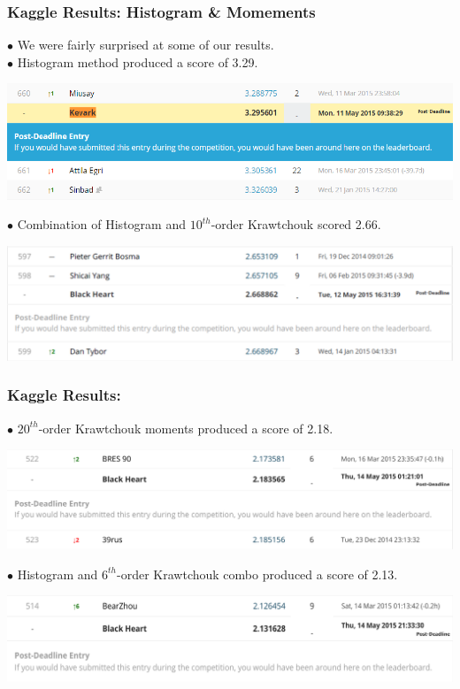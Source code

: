 \documentclass{beamer}
\begin{document}
\begin{frame}
	\frametitle{Kaggle Results: Histogram \& Momements}
$\bullet$ We were fairly surprised at some of our results.\\
$\bullet$ Histogram method produced a score of 3.29. \\
\begin{center}
	\includegraphics[scale=0.3]{submission.png}
\end{center}
$\bullet$ Combination of Histogram and $10^{th}$-order Krawtchouk scored 2.66\footnotemark. \\
\begin{center}
	\includegraphics[scale=0.25]{combined.png}
\end{center} 


\normalsize
\end{frame}


\begin{frame}
	\frametitle{Kaggle Results:}
$\bullet$ $20^{th}$-order Krawtchouk moments produced a score of 2.18. \\
\begin{center}
	\includegraphics[scale=0.2]{Telly.png}
\end{center}
$\bullet$ Histogram and $6^{th}$-order Krawtchouk combo produced a score of 2.13. \\
\begin{center}
	\includegraphics[scale=0.27]{KrawtBin6Mom.png}
\end{center}
\end{frame}
\end{document}
